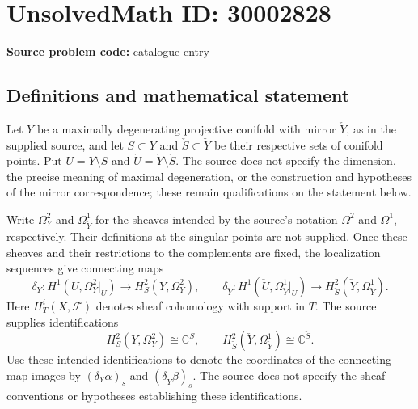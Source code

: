 \documentclass[11pt]{article}
\newcommand{\C}{\mathbb{C}}
\begin{document}
\section*{UnsolvedMath ID: 30002828}
\textbf{Source problem code:} catalogue entry
\subsection{Definitions and mathematical statement}
Let \(Y\) be a maximally degenerating projective conifold with mirror \(\check Y\), as in the supplied source, and let \(S\subset Y\) and \(\check S\subset\check Y\) be their respective sets of conifold points. Put \(U=Y\setminus S\) and \(\check U=\check Y\setminus\check S\). The source does not specify the dimension, the precise meaning of maximal degeneration, or the construction and hypotheses of the mirror correspondence; these remain qualifications on the statement below.

Write \(\Omega_Y^2\) and \(\Omega_{\check Y}^1\) for the sheaves intended by the source's notation \(\Omega^2\) and \(\Omega^1\), respectively. Their definitions at the singular points are not supplied. Once these sheaves and their restrictions to the complements are fixed, the localization sequences give connecting maps
\[
\delta_Y:H^1(U,\Omega_Y^2|_U)\longrightarrow H^2_S(Y,\Omega_Y^2),\qquad
\delta_{\check Y}:H^1(\check U,\Omega_{\check Y}^1|_{\check U})\longrightarrow H^2_{\check S}(\check Y,\Omega_{\check Y}^1).
\]
Here \(H^i_T(X,\mathcal F)\) denotes sheaf cohomology with support in \(T\). The source supplies identifications
\[
H^2_S(Y,\Omega_Y^2)\cong\C^S,\qquad
H^2_{\check S}(\check Y,\Omega_{\check Y}^1)\cong\C^{\check S}.
\]
Use these intended identifications to denote the coordinates of the connecting-map images by \((\delta_Y\alpha)_s\) and \((\delta_{\check Y}\beta)_{\check s}\). The source does not specify the sheaf conventions or hypotheses establishing these identifications.
\end{document}

